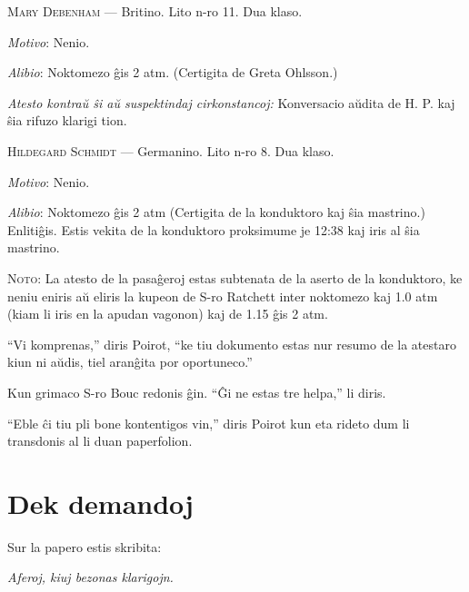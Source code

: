 \begin{addmargin}[1em]{2em}
\noindent \textsc{Mary Debenham} --- Britino. Lito n-ro 11. Dua klaso.

\emph{Motivo}: Nenio.

\emph{Alibio}: Noktomezo ĝis 2 atm. (Certigita de Greta Ohlsson.)

\emph{Atesto kontraŭ ŝi aŭ suspektindaj cirkonstancoj:} Konversacio aŭdita de H. P. kaj ŝia rifuzo klarigi tion.

\noindent \textsc{Hildegard Schmidt} --- Germanino. Lito n-ro 8. Dua klaso.

\emph{Motivo}: Nenio.

\emph{Alibio}: Noktomezo ĝis 2 atm (Certigita de la konduktoro kaj ŝia mastrino.) Enlitiĝis. Estis vekita de la konduktoro proksimume je 12:38 kaj iris al ŝia mastrino.

\noindent \textsc{Noto}: La atesto de la pasaĝeroj estas subtenata de la aserto de la konduktoro, ke neniu eniris aŭ eliris la kupeon de S-ro Ratchett inter noktomezo kaj 1.0 atm (kiam li iris en la apudan vagonon) kaj de 1.15 ĝis 2 atm.

\end{addmargin}

``Vi komprenas,'' diris Poirot, ``ke tiu dokumento estas nur resumo de la atestaro kiun ni aŭdis, tiel aranĝita por oportuneco.''

Kun grimaco S-ro Bouc redonis ĝin. ``Ĝi ne estas tre helpa,'' li diris.

``Eble ĉi tiu pli bone kontentigos vin,'' diris Poirot kun eta rideto dum li transdonis al li duan paperfolion.

\chapter[Dek demandoj]{Dek demandoj}


Sur la papero estis skribita:

\begin{center}\itshape Aferoj, kiuj bezonas klarigojn.\end{center}

